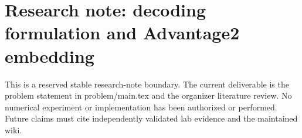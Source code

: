 \documentclass[11pt]{article}
\begin{document}
\section*{Research note: decoding formulation and Advantage2 embedding}
This is a reserved stable research-note boundary. The current deliverable is the problem statement in problem/main.tex and the organizer literature review. No numerical experiment or implementation has been authorized or performed. Future claims must cite independently validated lab evidence and the maintained wiki.
\end{document}
